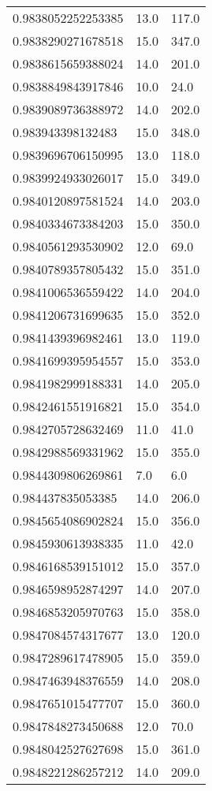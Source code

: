 \begin{center}
\begin{supertabular}[H]{p{0.30\textwidth}p{0.05\textwidth}p{0.05\textwidth}}
0.9838052252253385 & 13.0 & 117.0 \\ 
0.9838290271678518 & 15.0 & 347.0 \\ 
0.9838615659388024 & 14.0 & 201.0 \\ 
0.9838849843917846 & 10.0 & 24.0 \\ 
0.9839089736388972 & 14.0 & 202.0 \\ 
0.983943398132483 & 15.0 & 348.0 \\ 
0.9839696706150995 & 13.0 & 118.0 \\ 
0.9839924933026017 & 15.0 & 349.0 \\ 
0.9840120897581524 & 14.0 & 203.0 \\ 
0.9840334673384203 & 15.0 & 350.0 \\ 
0.9840561293530902 & 12.0 & 69.0 \\ 
0.9840789357805432 & 15.0 & 351.0 \\ 
0.9841006536559422 & 14.0 & 204.0 \\ 
0.9841206731699635 & 15.0 & 352.0 \\ 
0.9841439396982461 & 13.0 & 119.0 \\ 
0.9841699395954557 & 15.0 & 353.0 \\ 
0.9841982999188331 & 14.0 & 205.0 \\ 
0.9842461551916821 & 15.0 & 354.0 \\ 
0.9842705728632469 & 11.0 & 41.0 \\ 
0.9842988569331962 & 15.0 & 355.0 \\ 
0.9844309806269861 & 7.0 & 6.0 \\ 
0.984437835053385 & 14.0 & 206.0 \\ 
0.9845654086902824 & 15.0 & 356.0 \\ 
0.9845930613938335 & 11.0 & 42.0 \\ 
0.9846168539151012 & 15.0 & 357.0 \\ 
0.9846598952874297 & 14.0 & 207.0 \\ 
0.9846853205970763 & 15.0 & 358.0 \\ 
0.9847084574317677 & 13.0 & 120.0 \\ 
0.9847289617478905 & 15.0 & 359.0 \\ 
0.9847463948376559 & 14.0 & 208.0 \\ 
0.9847651015477707 & 15.0 & 360.0 \\ 
0.9847848273450688 & 12.0 & 70.0 \\ 
0.9848042527627698 & 15.0 & 361.0 \\ 
0.9848221286257212 & 14.0 & 209.0 \\ 

\end{supertabular}
\end{center}
